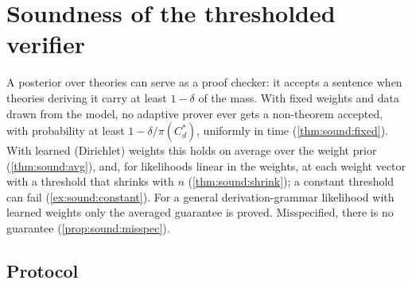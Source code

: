 \section{Soundness of the thresholded verifier}\label{sec:sound}

A posterior over theories can serve as a proof checker: it accepts a sentence when theories deriving it carry at least $1-\delta$ of the mass. With fixed weights and data drawn from the model, no adaptive prover ever gets a non-theorem accepted, with probability at least $1-\delta/\pi(C^*_d)$, uniformly in time (\cref{thm:sound:fixed}). With learned (Dirichlet) weights this holds on average over the weight prior (\cref{thm:sound:avg}), and, for likelihoods linear in the weights, at each weight vector with a threshold that shrinks with $n$ (\cref{thm:sound:shrink}); a constant threshold can fail (\cref{ex:sound:constant}). For a general derivation-grammar likelihood with learned weights only the averaged guarantee is proved. Misspecified, there is no guarantee (\cref{prop:sound:misspec}).

\subsection{Protocol}\label{sec:sound:protocol}

